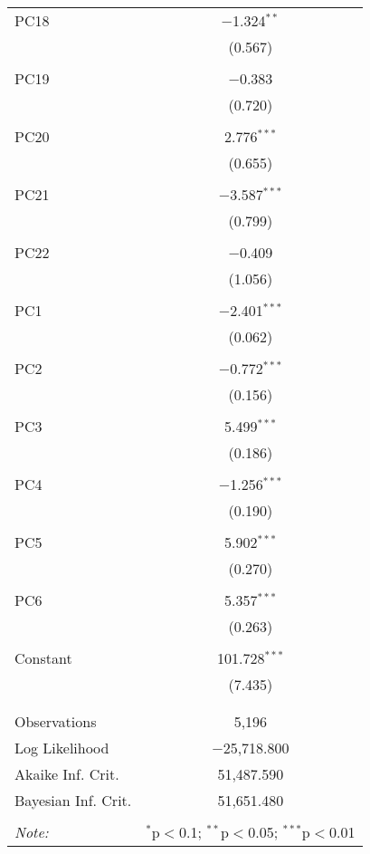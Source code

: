 \begin{table}[!htbp]
\begin{tabular}{@{\extracolsep{5pt}}lc}
 PC18 & $-$1.324$^{**}$ \\ 
  & (0.567) \\ 
  & \\ 
 PC19 & $-$0.383 \\ 
  & (0.720) \\ 
  & \\ 
 PC20 & 2.776$^{***}$ \\ 
  & (0.655) \\ 
  & \\ 
 PC21 & $-$3.587$^{***}$ \\ 
  & (0.799) \\ 
  & \\ 
 PC22 & $-$0.409 \\ 
  & (1.056) \\ 
  & \\ 
 PC1 & $-$2.401$^{***}$ \\ 
  & (0.062) \\ 
  & \\ 
 PC2 & $-$0.772$^{***}$ \\ 
  & (0.156) \\ 
  & \\ 
 PC3 & 5.499$^{***}$ \\ 
  & (0.186) \\ 
  & \\ 
 PC4 & $-$1.256$^{***}$ \\ 
  & (0.190) \\ 
  & \\ 
 PC5 & 5.902$^{***}$ \\ 
  & (0.270) \\ 
  & \\ 
 PC6 & 5.357$^{***}$ \\ 
  & (0.263) \\ 
  & \\ 
 Constant & 101.728$^{***}$ \\ 
  & (7.435) \\ 
  & \\ 
\hline \\[-1.8ex] 
Observations & 5,196 \\ 
Log Likelihood & $-$25,718.800 \\ 
Akaike Inf. Crit. & 51,487.590 \\ 
Bayesian Inf. Crit. & 51,651.480 \\ 
\hline 
\hline \\[-1.8ex] 
\textit{Note:}  & \multicolumn{1}{r}{$^{*}$p$<$0.1; $^{**}$p$<$0.05; $^{***}$p$<$0.01} \\ 
\end{tabular} 
\end{table} 
